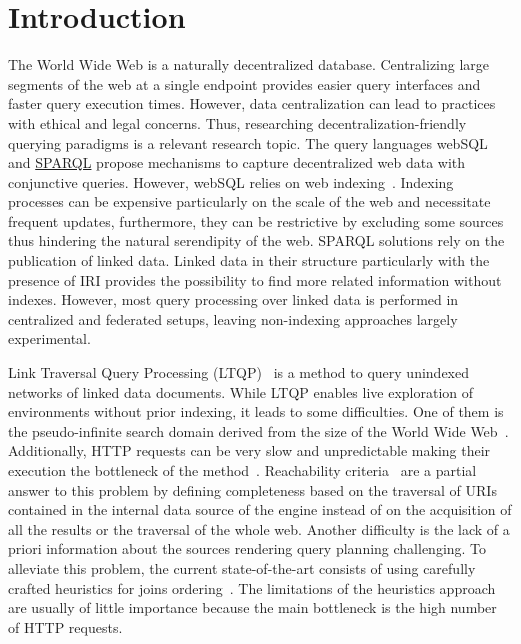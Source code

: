 \section{Introduction}

The World Wide Web is a naturally decentralized database.
Centralizing large segments of the web at a single endpoint provides easier query interfaces and faster query execution times.
However, data centralization can lead to practices with ethical and legal concerns.
Thus, researching decentralization-friendly querying paradigms is a relevant research topic.
The query languages webSQL~\cite{Mendelzon1996} and \href{https://www.w3.org/TR/sparql11-query/}{SPARQL} propose mechanisms to capture decentralized web data with conjunctive queries.
However, webSQL relies on web indexing~\cite{Mendelzon1996}.
Indexing processes can be expensive particularly on the scale of the web and necessitate frequent updates, furthermore, they can be restrictive by excluding some sources thus hindering the natural serendipity of the web.
SPARQL solutions rely on the publication of linked data.
Linked data in their structure particularly with the presence of IRI provides the possibility to find more related information without indexes.
However, most query processing over linked data is performed in centralized and federated setups, leaving non-indexing approaches largely experimental.

Link Traversal Query Processing (LTQP)~\cite{Hartig2012} is a method to query unindexed networks of linked data documents.
While LTQP enables live exploration of environments without prior indexing, it leads to some difficulties.
One of them is the pseudo-infinite search domain derived from the size of the World Wide Web~\cite{hartig2016walking}.
Additionally, HTTP requests can be very slow and unpredictable making their execution the bottleneck of the method~\cite{hartig2016walking}.
Reachability criteria~\cite{Hartig2012} are a partial answer to this problem by defining completeness based on the traversal of URIs
contained in the internal data source of the engine instead of on the acquisition of all the results or the traversal of the whole web.
Another difficulty is the lack of a priori information about the sources rendering query planning challenging.
To alleviate this problem, the current state-of-the-art consists of using carefully crafted heuristics for joins ordering~\cite{Hartig2011}.
The limitations of the heuristics approach are usually of little importance because the main bottleneck is the high number of HTTP requests.

